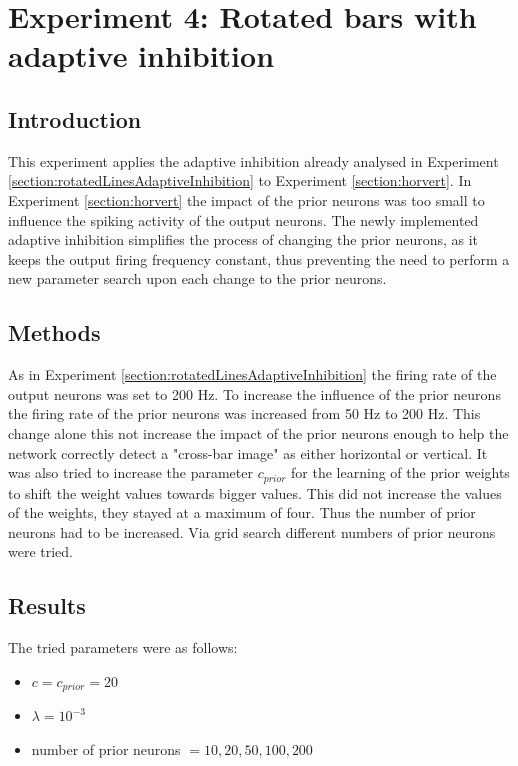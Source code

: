 \section{Experiment 4: Rotated bars with adaptive inhibition}
\label{section:horvertAdaptiveInhibition}

\subsection{Introduction}

This experiment applies the adaptive inhibition already analysed in Experiment \ref{section:rotatedLinesAdaptiveInhibition} to Experiment \ref{section:horvert}. In Experiment \ref{section:horvert} the impact of the prior neurons was too small to influence the spiking activity of the output neurons. The newly implemented adaptive inhibition simplifies the process of changing the prior neurons, as it keeps the output firing frequency constant, thus preventing the need to perform a new parameter search upon each change to the prior neurons.

\subsection{Methods}

As in Experiment \ref{section:rotatedLinesAdaptiveInhibition} the firing rate of the output neurons was set to 200 Hz. To increase the influence of the prior neurons the firing rate of the prior neurons was increased from  50 Hz to 200 Hz. This change alone this not increase the impact of the prior neurons enough to help the network correctly detect a "cross-bar image" as either horizontal or vertical. It was also tried to increase the parameter $c_{prior}$ for the learning of the prior weights to shift the weight values towards bigger values. This did not increase the values of the weights, they stayed at a maximum of four. Thus the number of prior neurons had to be increased. Via grid search different numbers of prior neurons were tried.

\subsection{Results}

The tried parameters were as follows:
\begin{itemize}
  \item $c = c_{prior} = 20$
  \item $\lambda = 10^{-3}$
  \item number of prior neurons $ = 10, 20, 50, 100, 200$
\end{itemize}

